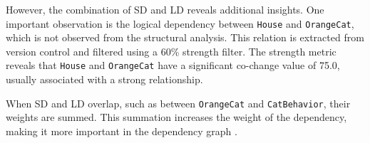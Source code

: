 However, the combination of SD and LD reveals additional insights. One important observation is the logical dependency between \texttt{House} and \texttt{OrangeCat}, which is not observed from the structural analysis. This relation is extracted from version control and filtered using a 60\% strength filter. The strength metric reveals that \texttt{House} and \texttt{OrangeCat} have a significant co-change value of 75.0, usually associated with a strong relationship.

When SD and LD overlap, such as between \texttt{OrangeCat} and \texttt{CatBehavior}, their weights are summed. This summation increases the weight of the dependency, making it more important in the dependency graph \cite{cluster-access}.


